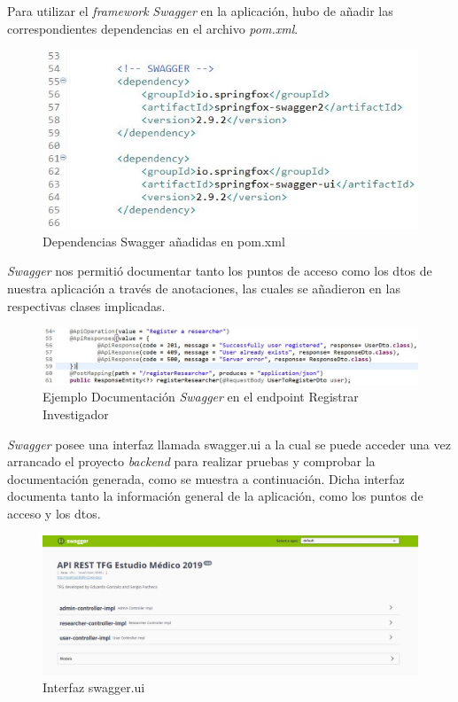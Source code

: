         Para utilizar el \textit{framework} \textit{Swagger} en la aplicación, hubo de añadir las correspondientes dependencias en el archivo \textit{pom.xml}.
        \newline
        
        \begin{figure}[h]
            \centering
            \includegraphics[width=1\textwidth]{images/swagger.JPG}
            \caption{Dependencias Swagger añadidas en pom.xml}
        \end{figure}
        
        \textit{Swagger} nos permitió documentar tanto los puntos de acceso como los dtos de nuestra aplicación a través de anotaciones, las cuales se añadieron en las respectivas clases implicadas.
        
          \begin{figure}[h]
            \centering
            \includegraphics[width=1\textwidth]{images/swaggerexample.JPG}
            \caption{Ejemplo Documentación \textit{Swagger} en el endpoint Registrar Investigador}
        \end{figure}
        
        
         \textit{Swagger} posee una interfaz llamada swagger.ui a la cual se puede acceder una vez arrancado el proyecto \textit{backend} para realizar pruebas y comprobar la documentación generada, como se muestra a continuación. Dicha interfaz documenta tanto la información general de la aplicación, como los puntos de acceso y los dtos.
         \newline
         
          \begin{figure}[h]
            \centering
            \includegraphics[width=1\textwidth]{images/swaggergeneral.JPG}
            \caption{Interfaz swagger.ui}
        \end{figure}
        

